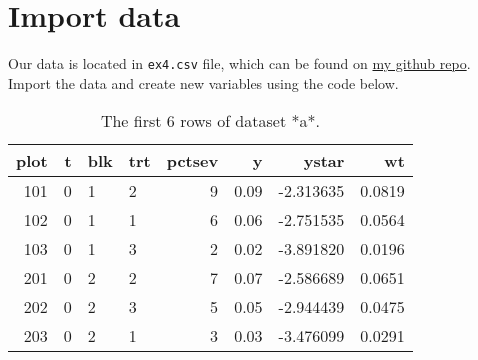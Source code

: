 \documentclass[]{book}
\newenvironment{Shaded}{\begin{snugshade}}{\end{snugshade}}
\newcommand{\CommentTok}[1]{\textcolor[rgb]{0.56,0.35,0.01}{\textit{#1}}}
\newcommand{\DataTypeTok}[1]{\textcolor[rgb]{0.13,0.29,0.53}{#1}}
\newcommand{\DecValTok}[1]{\textcolor[rgb]{0.00,0.00,0.81}{#1}}
\newcommand{\KeywordTok}[1]{\textcolor[rgb]{0.13,0.29,0.53}{\textbf{#1}}}
\newcommand{\NormalTok}[1]{#1}
\newcommand{\OperatorTok}[1]{\textcolor[rgb]{0.81,0.36,0.00}{\textbf{#1}}}
\newcommand{\StringTok}[1]{\textcolor[rgb]{0.31,0.60,0.02}{#1}}
\begin{document}
\hypertarget{import-data}{%
\section{Import data}\label{import-data}}

Our data is located in \texttt{ex4.csv} file, which can be found on \href{https://raw.githubusercontent.com/luckymehra/epidem-exercises/master/data/ex4.csv}{my github repo}. Import the data and create new variables using the code below.

\begin{Shaded}
\end{Shaded}

\begin{table}[t]

\caption{\label{tab:data-import}The first 6 rows of dataset *a*.}
\centering
\begin{tabular}{r|r|l|l|r|r|r|r}
\hline
plot & t & blk & trt & pctsev & y & ystar & wt\\
\hline
101 & 0 & 1 & 2 & 9 & 0.09 & -2.313635 & 0.0819\\
\hline
102 & 0 & 1 & 1 & 6 & 0.06 & -2.751535 & 0.0564\\
\hline
103 & 0 & 1 & 3 & 2 & 0.02 & -3.891820 & 0.0196\\
\hline
201 & 0 & 2 & 2 & 7 & 0.07 & -2.586689 & 0.0651\\
\hline
202 & 0 & 2 & 3 & 5 & 0.05 & -2.944439 & 0.0475\\
\hline
203 & 0 & 2 & 1 & 3 & 0.03 & -3.476099 & 0.0291\\
\hline
\end{tabular}
\end{table}
\end{document}
